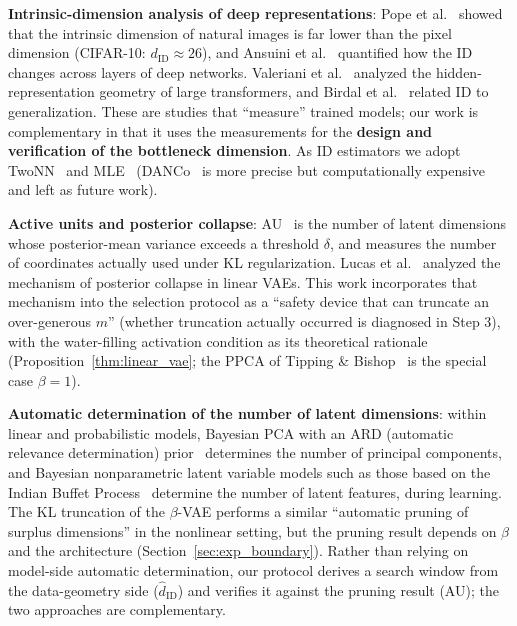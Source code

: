 \documentclass[make,article,submit,pdftex,moreauthors]{Definitions/mdpi}
\newcommand{\dID}{d_{\mathrm{ID}}}
\newcommand{\hatdID}{\hat{d}_{\mathrm{ID}}}
\begin{document}
\textbf{Intrinsic-dimension analysis of deep representations}:
Pope et al.~\cite{pope2021intrinsic} showed that the intrinsic dimension of
natural images is far lower than the pixel dimension (CIFAR-10:
$\dID \approx 26$), and Ansuini et al.~\cite{ansuini2019intrinsic}
quantified how the ID changes across layers of deep networks.
Valeriani et al.~\cite{valeriani2023geometry} analyzed the hidden-representation
geometry of large transformers, and Birdal et
al.~\cite{birdal2021intrinsic} related ID to generalization.
These are studies that ``measure'' trained models; our work is complementary
in that it uses the measurements for the \textbf{design and verification of
the bottleneck dimension}.
As ID estimators we adopt TwoNN~\cite{facco2017twonn} and
MLE~\cite{levina2005mle} (DANCo~\cite{ceruti2014danco} is more precise but
computationally expensive and left as future work).

\textbf{Active units and posterior collapse}:
AU~\cite{higgins2017betavae,lucas2019elbo} is the number of latent
dimensions whose posterior-mean variance exceeds a threshold $\delta$, and
measures the number of coordinates actually used under KL regularization.
Lucas et al.~\cite{lucas2019elbo} analyzed the mechanism of posterior
collapse in linear VAEs.
This work incorporates that mechanism into the selection protocol as a
``safety device that can truncate an over-generous $m$'' (whether truncation
actually occurred is diagnosed in Step 3), with the water-filling activation
condition as its theoretical rationale
(Proposition~\ref{thm:linear_vae}; the PPCA of Tipping \&
Bishop~\cite{tippingbishop1999ppca} is the special case $\beta = 1$).

\textbf{Automatic determination of the number of latent dimensions}:
within linear and probabilistic models, Bayesian PCA with an ARD (automatic
relevance determination) prior~\cite{bishop1999bayesian} determines the
number of principal components, and Bayesian nonparametric latent variable
models such as those based on the Indian Buffet
Process~\cite{ghahramani2005infinite} determine the number of latent
features, during learning.
The KL truncation of the $\beta$-VAE performs a similar ``automatic pruning
of surplus dimensions'' in the nonlinear setting, but the pruning result
depends on $\beta$ and the architecture (Section~\ref{sec:exp_boundary}).
Rather than relying on model-side automatic determination, our protocol
derives a search window from the data-geometry side ($\hatdID$) and
verifies it against the pruning result (AU); the two approaches are
complementary.
\end{document}
